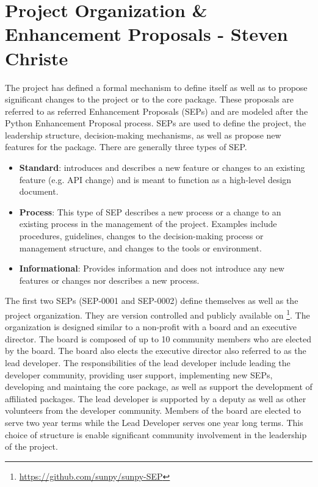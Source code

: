\section{Project Organization \& Enhancement Proposals - Steven Christe}
The \sunpy project has defined a formal mechanism to define itself as well as to propose significant changes to the project or to the core package. These proposals are referred
to as referred \sunpy Enhancement Proposals (SEPs) and are modeled after the Python Enhancement Proposal process. SEPs are used to define the project, the leadership structure, decision-making mechanisms, as well as propose new features for the \sunpypkg package. There are generally three types of SEP. 
\begin{itemize}
    \item \textbf{Standard}: introduces and describes a new feature or changes to an existing feature (e.g. API change) and is meant to function as a high-level design document.
    \item \textbf{Process}: This type of SEP describes a new process or a change to an existing process in the management of the project. Examples include procedures, guidelines, changes to the decision-making process or management structure, and changes to the tools or environment.
    \item \textbf{Informational}: Provides information and does not introduce any new features or changes nor describes a new process.
\end{itemize}
The first two SEPs (SEP-0001 and SEP-0002) define themselves as well as the \sunpy project organization. They are version controlled and publicly available on \github\footnote{\url{https://github.com/sunpy/sunpy-SEP}}. The organization is designed similar to a non-profit with a board and an executive director. The board is composed of up to 10 community members who are elected by the board. The board also elects the executive director also referred to as the lead developer. The responsibilities of the lead developer include leading the developer community, providing user support, implementing new SEPs, developing and maintaing the core package, as well as support the development of affiliated packages. The lead developer is supported by a deputy as well as other volunteers from the developer community. Members of the board are elected to serve two year terms while the Lead Developer serves one year long terms. This choice of structure is enable significant community involvement in the leadership of the project.

